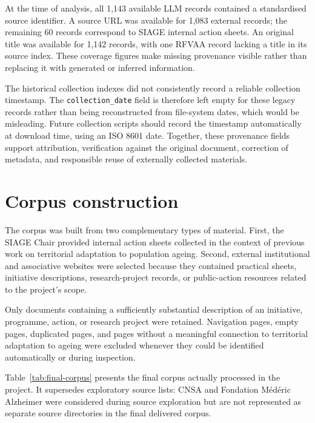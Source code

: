 At the time of analysis, all 1,143 available LLM records contained a
standardised source identifier. A source URL was available for 1,083 external
records; the remaining 60 records correspond to SIAGE internal action sheets.
An original title was available for 1,142 records, with one RFVAA record lacking
a title in its source index. These coverage figures make missing provenance
visible rather than replacing it with generated or inferred information.

The historical collection indexes did not consistently record a reliable
collection timestamp. The \texttt{collection\_date} field is therefore left
empty for these legacy records rather than being reconstructed from file-system
dates, which would be misleading. Future collection scripts should record the
timestamp automatically at download time, using an ISO 8601 date. Together,
these provenance fields support attribution, verification against the original
document, correction of metadata, and responsible reuse of externally collected
materials.

\section{Corpus construction}

The corpus was built from two complementary types of material. First, the SIAGE
Chair provided internal action sheets collected in the context of previous work
on territorial adaptation to population ageing. Second, external institutional
and associative websites were selected because they contained practical sheets,
initiative descriptions, research-project records, or public-action resources
related to the project's scope.

Only documents containing a sufficiently substantial description of an
initiative, programme, action, or research project were retained. Navigation
pages, empty pages, duplicated pages, and pages without a meaningful connection
to territorial adaptation to ageing were excluded whenever they could be
identified automatically or during inspection.

Table~\ref{tab:final-corpus} presents the final corpus actually processed in
the project. It supersedes exploratory source lists: CNSA and Fondation Médéric
Alzheimer were considered during source exploration but are not represented as
separate source directories in the final delivered corpus.

